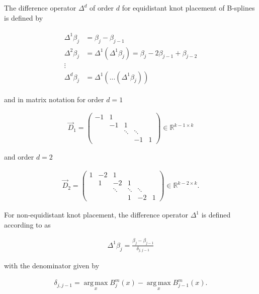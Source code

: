 \documentclass[10pt,a4paper]{report}
\begin{document}
The difference operator  $\Delta^d$ of order $d$ for equidistant knot placement of B-splines is defined by

\begin{align} \label{eq:difference-operators}
	\begin{split}
		\Delta^1 \beta_j &= \beta_j - \beta_{j-1} \\
		\Delta^2 \beta_j &= \Delta^1(\Delta^1 \beta_j) = \beta_j - 2\beta_{j-1} + \beta_{j-2} \\ 
		\vdots \\ 
		\Delta^d \beta_j &= \Delta^1(...(\Delta^1 \beta_j))
	\end{split}
\end{align}

and in matrix notation for order $d=1$

\begin{align} \label{eq:d1-difference-matrix}
	\vec{D}_1 = 
	\begin{pmatrix} 
		-1& 1&       &        &   \\  
		&-1& 1     &        &   \\  
		&  &\ddots & \ddots &   \\ 
		&  &       & -1     & 1 
	\end{pmatrix} \in \mathbb R^{k-1\times k}
\end{align}

and order $d=2$

\begin{align} \label{eq:d2-difference-matrix}
	\vec{D}_2 = 
	\begin{pmatrix} 
		1& -2& 1& &    \\  
		& 1 & -2 & 1& \\ 
		&  & \ddots & \ddots  & \ddots \\ 
		& & & 1 & -2 & 1 
	\end{pmatrix} \in \mathbb R^{k-2\times k}.
\end{align}

For non-equidistant knot placement, the difference operator $\Delta^1$ is defined according to \cite{ferziger2008numerische} as

\begin{align} \label{eq:d1-operator-nonequidistant}
	\Delta^1 \beta_j = \frac{\beta_j - \beta_{j-1}}{\delta_{j, j-1}}
\end{align}

with the denominator given by 

\begin{align} 
	\delta_{j, j-1} = \operatorname*{arg\, max}_x B_j^m(x) - \operatorname*{arg\, max}_x B_{j-1}^m(x).
\end{align}
\end{document}
